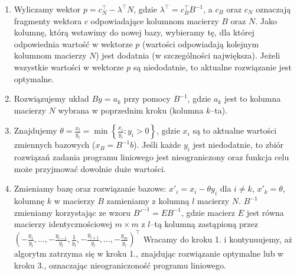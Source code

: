 \documentclass[licencjacka]{pracamgr}
\begin{document}
\begin{enumerate}
\item Wyliczamy wektor $p=c_N^{\top}-\lambda^{\top} N$, gdzie $\lambda^{\top}=c_B^{\top}B^{-1}$, a $c_B$ oraz $c_N$ oznaczają fragmenty wektora $c$ odpowiadające kolumnom macierzy $B$ oraz $N$.
Jako kolumnę, którą wstawimy do nowej bazy, wybieramy tę, dla której odpowiednia wartość w wektorze $p$
(wartości odpowiadają kolejnym kolumnom macierzy $N$) jest dodatnia (w szczególności największa).\newline
Jeżeli wszystkie wartości w wektorze $p$ są niedodatnie, to aktualne rozwiązanie jest optymalne.
%
\item Rozwiązujemy układ $By=a_k$ przy pomocy $B^{-1}$, gdzie $a_k$ jest to kolumna macierzy $N$ wybrana w poprzednim kroku (kolumna $k$--ta).
%
\item Znajdujemy $\theta=\frac{x_l}{y_l}=\min{\left\{\frac{x_i}{y_i}:y_i>0\right\}}$, gdzie $x_i$ są to aktualne wartości zmiennych bazowych ($x_B=B^{-1}b$).\newline
Jeśli każde $y_i$ jest niedodatnie, to zbiór rozwiązań zadania programu liniowego jest nieograniczony oraz funkcja celu może przyjmować dowolnie duże wartości.
%
\item Zmieniamy bazę oraz rozwiązanie bazowe: $x'_i=x_i-\theta y_i$ dla $i\neq k$, $x'_k=\theta$, kolumnę $k$ w macierzy $B$ zamieniamy z kolumną $l$ macierzy $N$.
$B^{-1}$ zmieniamy korzystając ze wzoru $B'^{-1}=EB^{-1}$, gdzie macierz $E$ jest równa macierzy identycznościowej $m\times m$ z $l$--tą kolumną zastąpioną przez 
$(-\frac{y_1}{y_l},...,-\frac{y_{l-1}}{y_l},\frac{1}{y_l},-\frac{y_{l+1}}{y_l},...,-\frac{y_m}{y_l})^{\top}$\newline\newline
%
Wracamy do kroku 1. i kontynuujemy, aż algorytm zatrzyma się w kroku 1., znajdując rozwiązanie optymalne lub w kroku 3., oznaczając nieograniczoność programu liniowego.
\end{enumerate}
\end{document}
